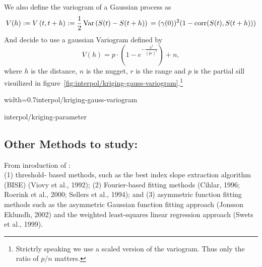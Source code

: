 We also define the variogram of a Gaussian process as
$$V(h):=V\left(t, t+h\right):=\frac{1}{2} \operatorname{Var}\left(S(t)-S(t+h)\right)\\ %
    =(\gamma(0))^2(1-\operatorname{corr}(S(t),S(t+h)))
$$
And decide to use a gaussian Variogram defined by
$$V(h) = p \cdot\left(1-e^{-\frac{h^{2}}{\left(\frac{4}{7} r\right)^{2}}}\right)+n,$$
where $h$ is the distance, $n$ is the nugget, $r$ is the range and $p$ is the partial sill visuilized in figure~\ref{fig:interpol/kriging-gauss-variogram}.\footnote{Strictrly speaking we use a scaled version of the variogram. Thus only the ratio of $p/n$ matters.}
\begin{my_figure}[h]{width=0.7\textwidth}{interpol/kriging-gauss-variogram}
    \caption{Gaussian Variogram with nugget=1, partial sill=3, range=55}
    \label{fig:interpol/kriging-gauss-variogram}
\end{my_figure}

\begin{my_figure}{}{interpol/kriging-parameter}
\end{my_figure}


\subsection{Other Methods to study:}
From inroduction of \cite{chenSimpleMethodReconstructing2004a}:\\
(1) threshold-
based methods, such as the best index slope extraction
algorithm (BISE) (Viovy et al., 1992); (2) Fourier-based
fitting methods (Cihlar, 1996; Roerink et al., 2000; Sellers
et al., 1994); and (3) asymmetric function fitting methods
such as the asymmetric Gaussian function fitting approach
(Jonsson Eklundh, 2002) and the weighted least-squares
linear regression approach (Swets et al., 1999).
